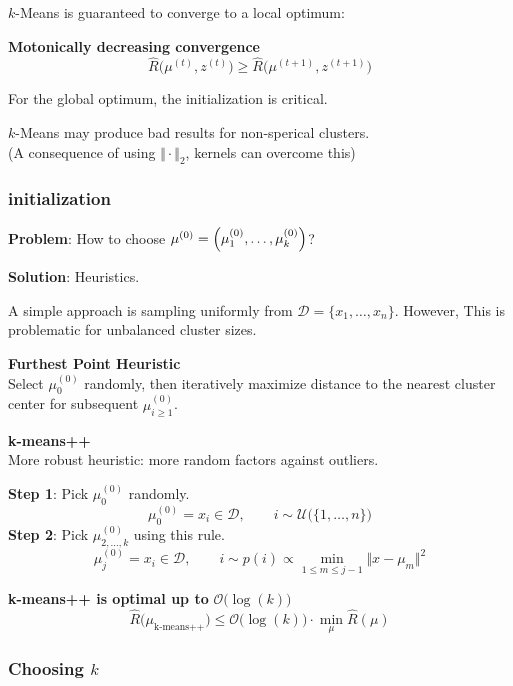 $k$-Means is guaranteed to converge to a local optimum:

\theorem \textbf{Motonically decreasing convergence}\\
$$
    \hat{R}\bigl( \mu^{(t)},z^{(t)} \bigr) \geq \hat{R}\bigl( \mu^{(t+1)},z^{(t+1)} \bigr)
$$

{\footnotesize
    \remark For the global optimum, the initialization is critical.
}

{\footnotesize
    \remark $k$-Means may produce bad results for non-sperical clusters.\\ 
    \color{gray}(A consequence of using $\Vert\cdot\Vert_2$, kernels can overcome this)
}

\subsubsection{initialization}

\textbf{Problem}: How to choose $\mu^{(0)} = \Bigl(\mu^{(0)}_1,\ldots,\mu^{(0)}_k  \Bigr)$?

\textbf{Solution}: Heuristics.

A simple approach is sampling uniformly from $\mathcal{D} = \{x_1,\ldots,x_n\}$. However, This is problematic for unbalanced cluster sizes.\\

\method \textbf{Furthest Point Heuristic}\\
Select $\mu^{(0)}_0$ randomly, then iteratively maximize distance to the nearest cluster center for subsequent $\mu^{(0)}_{i\geq1}$.

\method \textbf{k-means++}\\
More robust heuristic: more random factors against outliers.

\textbf{Step 1}: Pick $\mu^{(0)}_0$ randomly.
$$
    \mu^{(0)}_0 = x_i \in \mathcal{D}, \qquad i \sim \mathcal{U}\bigl(\{1,\ldots,n\}\bigr)
$$
\textbf{Step 2}: Pick $\mu^{(0)}_{2,\ldots,k}$ using this rule.
$$
    \mu^{(0)}_j = x_i \in \mathcal{D}, \qquad i \sim p(i) \propto \underset{1 \leq m \leq j-1}{\min}\bigl\Vert x-\mu_m \bigr\Vert^2
$$

\theorem \textbf{k-means++ is optimal up to} $\mathcal{O}\bigl(\log(k)\bigr)$
$$
    \hat{R}\bigl( \mu_\text{k-means++} \bigr) \leq \mathcal{O}\bigl(\log(k)\bigr)\cdot \underset{\mu}{\min} \hat{R}(\mu)
$$

\subsubsection{Choosing $k$}


